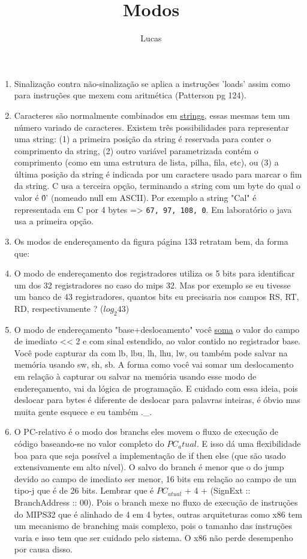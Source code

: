 \documentclass{article}
\author{Lucas}
\title{Modos}
\begin{document}
\maketitle

\begin{enumerate}

\item Sinalização contra não-sinalização se aplica a instruções 'loads' assim
como para instruções que mexem com aritmética (Patterson pg 124).

\item Caracteres são normalmente combinados em \underline{strings}, essas
mesmas tem um número variado de caracteres. Existem três possibilidades para
representar uma string: (1) a primeira posição da string é reservada para
conter o comprimento da string, (2) outro variável parametrizada contém o
comprimento (como em uma estrutura de lista, pilha, fila, etc), ou (3) a última
posição da string é indicada por um caractere usado para marcar o fim da
string. C usa a terceira opção, terminando a string com um byte do qual o valor 
é \'0' (nomeado null em ASCII). Por exemplo a string "Cal" é representada em C
por 4 bytes => \verb|67, 97, 108, 0|. Em laboratório o java usa a primeira
opção.

\item Os modos de endereçamento da figura página 133 retratam bem, da forma que:

\item O modo de endereçamento dos registradores utiliza os 5 bits para
identificar um dos 32 registradores no caso do mips 32. Mas por exemplo se eu
tivesse um banco de 43 registradores, quantos bits eu precisaria nos campos RS,
RT, RD, respectivamente ? ($log_2 43$)

\item O modo de endereçamento "base+deslocamento" você \underline{soma} o
valor do campo de imediato << 2 e com sinal estendido, ao valor contido no
registrador base. Você pode capturar da com lb, lbu, lh, lhu, lw, ou também
pode salvar na memória usando sw, sh, sb. A forma como você vai somar um
deslocamento em relação à capturar ou salvar na memória usando esse modo de
endereçamento, vai da lógica de programação. E cuidado com essa ideia, pois
deslocar para bytes é diferente de deslocar para palavras inteiras, é óbvio mas
muita gente esquece e eu também .\_.

\item O PC-relativo é o modo dos branchs eles movem o fluxo de execução de
código baseando-se no valor completo do $PC_atual$. E isso dá uma flexibilidade
boa para que seja possível a implementação de if then else (que são usado
extensivamente em alto nível). O salvo do branch é menor que o do jump devido ao
campo de imediato ser menor, 16 bits em relação ao campo de um tipo-j que é de
26 bits. Lembrar que é $PC_{atual}$ + 4 + (SignExt :: BranchAddress :: 00). Pois
o branch mexe no fluxo de execução de instruções do MIPS32 que é alinhado de 4
em 4 bytes, outras arquiteturas como x86 tem um mecanismo de branching mais
complexo, pois o tamanho das instruções varia e isso tem que ser cuidado pelo
sistema. O x86 não perde desempenho por causa disso.


\end{enumerate}
\end{document}
